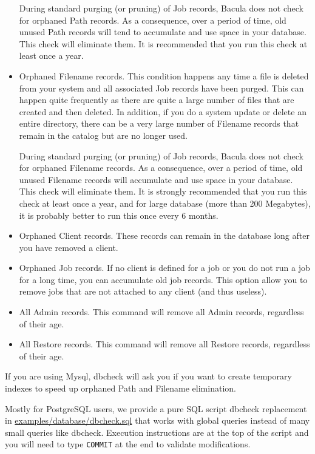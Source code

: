 \begin{itemize}
   During standard purging (or pruning) of Job records, Bacula does  not check
   for orphaned Path records. As a consequence, over a period  of time, old
   unused Path records will tend to accumulate and use  space in your database.
   This check will eliminate them. It is recommended that you run this
   check at least once a year.
\item Orphaned Filename records. This condition happens any time a file is
   deleted from your system and all associated Job records have been purged.
   This can happen quite frequently as there are quite a large number  of files
   that are created and then deleted. In addition, if you  do a system update or
   delete an entire directory, there can be  a very large number of Filename
   records that remain in the catalog  but are no longer used.

   During standard purging (or pruning) of Job records, Bacula does  not check
   for orphaned Filename records. As a consequence, over a period  of time, old
   unused Filename records will accumulate and use  space in your database. This
   check will eliminate them. It is strongly  recommended that you run this check
   at least once a year, and for  large database (more than 200 Megabytes), it is
   probably better to  run this once every 6 months.
\item Orphaned Client records. These records can remain in the database  long
   after you have removed a client.
\item Orphaned Job records. If no client is defined for a job or you  do not
   run a job for a long time, you can accumulate old job  records. This option
   allow you to remove jobs that are not  attached to any client (and thus
   useless).
\item All Admin records. This command will remove all Admin records,
   regardless of their age.
\item All Restore records. This command will remove all Restore records,
   regardless of their age.
\end{itemize}


If you are using Mysql, dbcheck will ask you if you want to create temporary
indexes to speed up orphaned Path and Filename elimination.

Mostly for PostgreSQL users, we provide a pure SQL script dbcheck replacement
in \url{examples/database/dbcheck.sql} that works with global queries instead
of many small queries like dbcheck. Execution instructions are at the top of
the script and you will need to type \texttt{COMMIT} at the end to validate
modifications.

